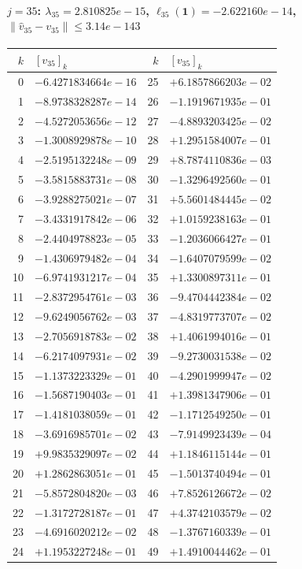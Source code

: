 \documentclass[11pt]{article}
\begin{document}
\paragraph{$j = 35$: $\lambda_{35} = 2.810825e-15$, \quad $\ell_{35}(\mathbf{1}) = -2.622160e-14$, \quad $\|\hat v_{35} - v_{35}\| \leq 3.14e-143$}
\begin{center}
{\footnotesize
\begin{tabular}{r@{\;\;}l@{\quad}r@{\;\;}l}
\toprule
$k$ & $[v_{35}]_k$ & $k$ & $[v_{35}]_k$ \\
\midrule
0 & $-6.4271834664e-16$ & 25 & $+6.1857866203e-02$ \\
1 & $-8.9738328287e-14$ & 26 & $-1.1919671935e-01$ \\
2 & $-4.5272053656e-12$ & 27 & $-4.8893203425e-02$ \\
3 & $-1.3008929878e-10$ & 28 & $+1.2951584007e-01$ \\
4 & $-2.5195132248e-09$ & 29 & $+8.7874110836e-03$ \\
5 & $-3.5815883731e-08$ & 30 & $-1.3296492560e-01$ \\
6 & $-3.9288275021e-07$ & 31 & $+5.5601484445e-02$ \\
7 & $-3.4331917842e-06$ & 32 & $+1.0159238163e-01$ \\
8 & $-2.4404978823e-05$ & 33 & $-1.2036066427e-01$ \\
9 & $-1.4306979482e-04$ & 34 & $-1.6407079599e-02$ \\
10 & $-6.9741931217e-04$ & 35 & $+1.3300897311e-01$ \\
11 & $-2.8372954761e-03$ & 36 & $-9.4704442384e-02$ \\
12 & $-9.6249056762e-03$ & 37 & $-4.8319773707e-02$ \\
13 & $-2.7056918783e-02$ & 38 & $+1.4061994016e-01$ \\
14 & $-6.2174097931e-02$ & 39 & $-9.2730031538e-02$ \\
15 & $-1.1373223329e-01$ & 40 & $-4.2901999947e-02$ \\
16 & $-1.5687190403e-01$ & 41 & $+1.3981347906e-01$ \\
17 & $-1.4181038059e-01$ & 42 & $-1.1712549250e-01$ \\
18 & $-3.6916985701e-02$ & 43 & $-7.9149923439e-04$ \\
19 & $+9.9835329097e-02$ & 44 & $+1.1846115144e-01$ \\
20 & $+1.2862863051e-01$ & 45 & $-1.5013740494e-01$ \\
21 & $-5.8572804820e-03$ & 46 & $+7.8526126672e-02$ \\
22 & $-1.3172728187e-01$ & 47 & $+4.3742103579e-02$ \\
23 & $-4.6916020212e-02$ & 48 & $-1.3767160339e-01$ \\
24 & $+1.1953227248e-01$ & 49 & $+1.4910044462e-01$ \\
\bottomrule
\end{tabular}
}
\end{center}
\end{document}
